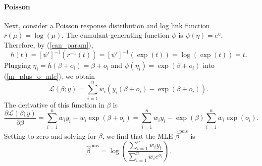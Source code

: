 \documentclass[12pt]{article}
\begin{document}
\begin{appendices}
\begin{refsection}
		\paragraph{Poisson}
		Next, consider a Poisson response distribution and log link function $r(\mu) = \log(\mu).$ The cumulant-generating function $\psi$ is $\psi(\eta) = e^\eta.$ Therefore, by (\ref{can_param}),
		$$h(t) = [\psi']^{-1}(r^{-1}(t)) = [\psi']^{-1} \left(\exp(t) \right) = \log(\exp(t)) = t.$$ Plugging $\eta_i = h(\beta + o_i) = \beta + o_i$ and $\psi(\eta_i) = \exp(\beta + o_i)$ into (\ref{m_plus_o_mle}), we obtain
		$$ \mathcal{L}(\beta; y) = \sum_{i=1}^n w_i \left( y_i(\beta + o_i) - \exp(\beta + o_i) \right).$$ The derivative of this function in $\beta$ is 
		$$\frac{\partial \mathcal{L}(\beta; y)}{\partial \beta} = \sum_{i=1}^n w_iy_i - w_i \exp(\beta + o_i) = \sum_{i=1}^n w_i y_i - \exp(\beta) \sum_{i=1}^n w_i \exp(o_i).$$
		Setting to zero and solving for $\beta$, we find that the MLE $\hat{\beta}^\textrm{pois}$ is
		\begin{equation}\label{pois_mle}
		\hat{\beta}^\textrm{pois} = \log\left(\frac{\sum_{i=1}^n w_i y_i}{\sum_{i=1}^n w_i e^{o_i}}\right).
		\end{equation}
		

\end{refsection}
\end{appendices}
\end{document}
